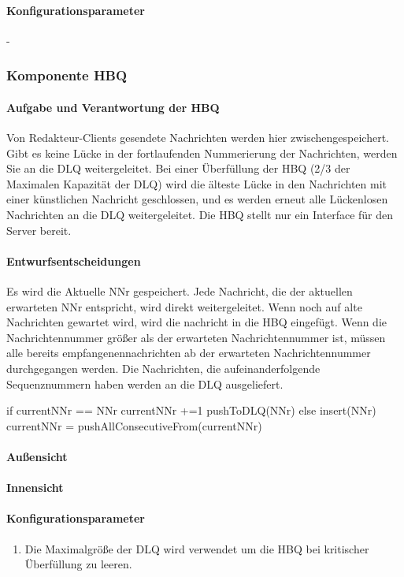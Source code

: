 \documentclass{article}
\begin{document}
			\paragraph{Konfigurationsparameter}
				-
			
			
		\subsubsection{Komponente HBQ}
			\paragraph{Aufgabe und Verantwortung der HBQ}
				Von Redakteur-Clients gesendete Nachrichten werden hier zwischengespeichert. Gibt es keine Lücke in der fortlaufenden Nummerierung der Nachrichten, werden Sie an die DLQ weitergeleitet. Bei einer Überfüllung der HBQ (2/3 der Maximalen Kapazität der DLQ) wird die älteste Lücke in den Nachrichten mit einer künstlichen Nachricht geschlossen, und es werden erneut alle Lückenlosen Nachrichten an die DLQ weitergeleitet. Die HBQ stellt nur ein Interface für den Server bereit.
			\paragraph{Entwurfsentscheidungen}
				Es wird die Aktuelle NNr gespeichert.
				Jede Nachricht, die der aktuellen erwarteten NNr entspricht, wird direkt weitergeleitet.
				Wenn noch auf alte Nachrichten gewartet wird, wird die nachricht in die HBQ eingefügt.
				Wenn die Nachrichtennummer größer als der erwarteten Nachrichtennummer ist,
				müssen alle bereits empfangenennachrichten ab der erwarteten Nachrichtennummer durchgegangen werden.
				Die Nachrichten, die aufeinanderfolgende Sequenznummern haben werden an die
				DLQ ausgeliefert.
				
				if currentNNr == NNr
					currentNNr +=1
					pushToDLQ(NNr)
				else
					insert(NNr)
					currentNNr = pushAllConsecutiveFrom(currentNNr) 
				
			\paragraph{Außensicht}
			\paragraph{Innensicht}
			\paragraph{Konfigurationsparameter}
				\begin{enumerate}
    				\item{Die Maximalgröße der DLQ wird verwendet um die HBQ bei kritischer 
    				Überfüllung zu leeren.}
    			\end{enumerate}
			
\end{document}
